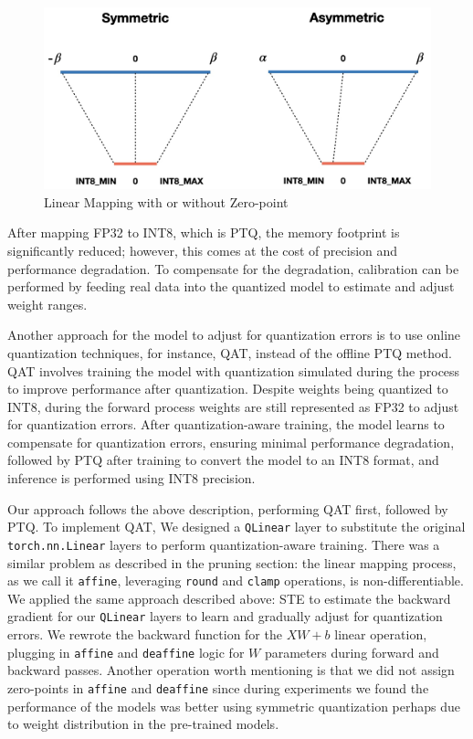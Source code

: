 \begin{figure}[hbpt]
    \centering
    \includegraphics[width=\linewidth]{images/0.003}
    \caption{Linear Mapping with or without Zero-point}
    \label{fig:sub4}
\end{figure}

After mapping FP32 to INT8, which is PTQ, the memory footprint is significantly reduced; however, this comes at the cost of precision and performance degradation. To compensate for the degradation, calibration can be performed by feeding real data into the quantized model to estimate and adjust weight ranges.

Another approach for the model to adjust for quantization errors is to use online quantization techniques, for instance, QAT, instead of the offline PTQ method. QAT involves training the model with quantization simulated during the process to improve performance after quantization. Despite weights being quantized to INT8, during the forward process weights are still represented as FP32 to adjust for quantization errors. After quantization-aware training, the model learns to compensate for quantization errors, ensuring minimal performance degradation, followed by PTQ after training to convert the model to an INT8 format, and inference is performed using INT8 precision.

Our approach follows the above description, performing QAT first, followed by PTQ. To implement QAT, We designed a \texttt{QLinear} layer to substitute the original \texttt{torch.nn.Linear} layers to perform quantization-aware training. There was a similar problem as described in the pruning section: the linear mapping process, as we call it \texttt{affine}, leveraging \texttt{round} and \texttt{clamp} operations, is non-differentiable. We applied the same approach described above: STE to estimate the backward gradient for our \texttt{QLinear} layers to learn and gradually adjust for quantization errors. We rewrote the backward function for the $XW + b$ linear operation, plugging in \texttt{affine} and \texttt{deaffine} logic for $W$ parameters during forward and backward passes. Another operation worth mentioning is that we did not assign zero-points in \texttt{affine} and \texttt{deaffine} since during experiments we found the performance of the models was better using symmetric quantization perhaps due to weight distribution in the pre-trained models.
